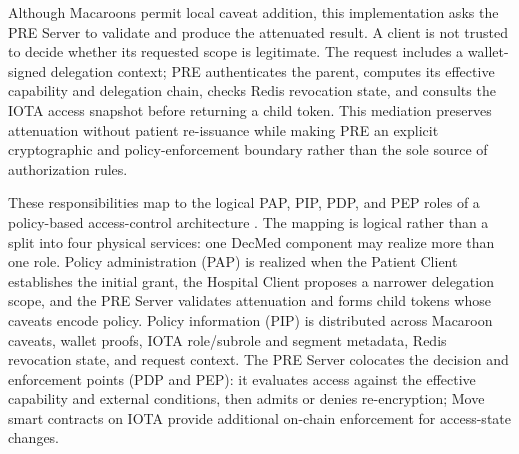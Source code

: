 Although Macaroons permit local caveat addition, this implementation asks the PRE Server to validate and produce the attenuated result. A client is not trusted to decide whether its requested scope is legitimate. The request includes a wallet-signed delegation context; PRE authenticates the parent, computes its effective capability and delegation chain, checks Redis revocation state, and consults the IOTA access snapshot before returning a child token. This mediation preserves attenuation without patient re-issuance while making PRE an explicit cryptographic and policy-enforcement boundary rather than the sole source of authorization rules.

These responsibilities map to the logical PAP, PIP, PDP, and PEP roles of a policy-based access-control architecture \cite{hu2014abac}. The mapping is logical rather than a split into four physical services: one DecMed component may realize more than one role. Policy administration (PAP) is realized when the Patient Client establishes the initial grant, the Hospital Client proposes a narrower delegation scope, and the PRE Server validates attenuation and forms child tokens whose caveats encode policy. Policy information (PIP) is distributed across Macaroon caveats, wallet proofs, IOTA role/subrole and segment metadata, Redis revocation state, and request context. The PRE Server colocates the decision and enforcement points (PDP and PEP): it evaluates access against the effective capability and external conditions, then admits or denies re-encryption; Move smart contracts on IOTA provide additional on-chain enforcement for access-state changes.